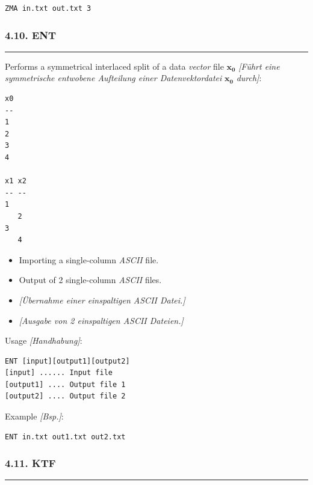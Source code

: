 \documentclass[
]{article}
\begin{document}
\begin{verbatim}
ZMA in.txt out.txt 3
\end{verbatim}

\hypertarget{ent}{%
\subsubsection{4.10. ENT}\label{ent}}

\begin{center}\rule{0.5\linewidth}{0.5pt}\end{center}

Performs a symmetrical interlaced split of a data \emph{vector} file
\(\mathbf{x_0}\) \emph{{[}Führt eine symmetrische entwobene Aufteilung
einer Datenvektordatei} \(\mathbf{x_0}\) \emph{durch{]}}:

\begin{verbatim}
x0
--
1
2
3
4

x1 x2
-- --
1
   2
3
   4
\end{verbatim}

\begin{itemize}
\item
  Importing a single-column \emph{ASCII} file.
\item
  Output of 2 single-column \emph{ASCII} files.
\item
  \emph{{[}Übernahme einer einspaltigen ASCII Datei.{]}}
\item
  \emph{{[}Ausgabe von 2 einspaltigen ASCII Dateien.{]}}
\end{itemize}

Usage \emph{{[}Handhabung{]}}:

\begin{verbatim}
ENT [input][output1][output2] 
[input] ...... Input file  
[output1] .... Output file 1 
[output2] .... Output file 2
\end{verbatim}

Example \emph{{[}Bsp.{]}}:

\begin{verbatim}
ENT in.txt out1.txt out2.txt
\end{verbatim}

\hypertarget{ktf}{%
\subsubsection{4.11. KTF}\label{ktf}}

\begin{center}\rule{0.5\linewidth}{0.5pt}\end{center}
\end{document}
